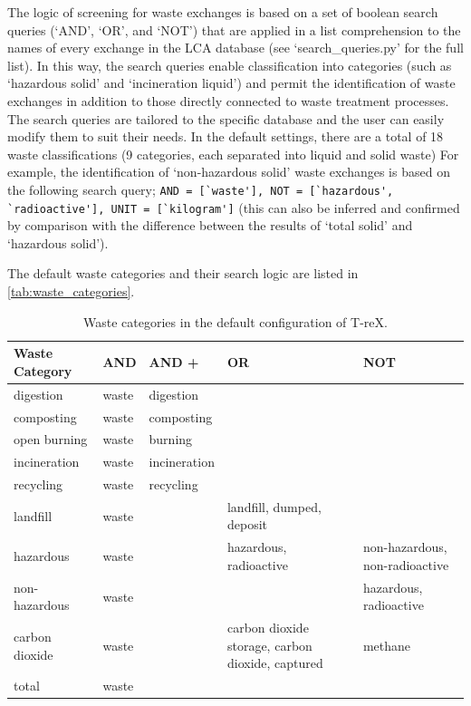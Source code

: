 \documentclass{article}
\renewcommand{\texttt}[1]{{\ttfamily\small\nolinkurl{#1}}}
\begin{document}
The logic of screening for waste exchanges is based on a set of boolean search queries (`AND', `OR', and `NOT') that are applied in a list comprehension to the names of every exchange in the LCA database (see `search\_queries.py' for the full list). In this way, the search queries enable classification into categories (such as `hazardous solid' and `incineration liquid') and permit the identification of waste exchanges in addition to those directly connected to waste treatment processes. The search queries are tailored to the specific database and the user can easily modify them to suit their needs. In the default settings, there are a total of 18 waste classifications (9 categories, each separated into liquid and solid waste) For example, the identification of `non-hazardous solid' waste exchanges is based on the following search query; \texttt{AND = [`waste'], NOT = [`hazardous', `radioactive'], UNIT = [`kilogram']} (this can also be inferred and confirmed by comparison with the difference between the results of `total solid' and `hazardous solid').

The default waste categories and their search logic are listed in \autoref{tab:waste_categories}. 

\begin{table}[ht]
    \centering
    \caption{Waste categories in the default configuration of T-reX.}\label{tab:waste_categories}
    \begin{tabularx}{\textwidth}{p{2.5cm}p{1cm}p{1.5cm}XX}
    \toprule
    \textbf{Waste Category} & \textbf{AND} & \textbf{AND +} & \textbf{OR} & \textbf{NOT} \\
    \midrule
    digestion & waste & digestion & & \\
    composting & waste & composting & & \\
    open burning & waste & burning & & \\
    incineration & waste & incineration & & \\
    recycling & waste & recycling & & \\
    landfill & waste & & landfill, dumped, deposit & \\
    hazardous & waste & & hazardous, radioactive & non-hazardous, non-radioactive \\
    non-hazardous & waste & & & hazardous, radioactive \\
    carbon dioxide & waste & & carbon dioxide storage, carbon dioxide, captured & methane \\
    total & waste & & & \\
    \bottomrule
    \end{tabularx}
\end{table}
\end{document}
